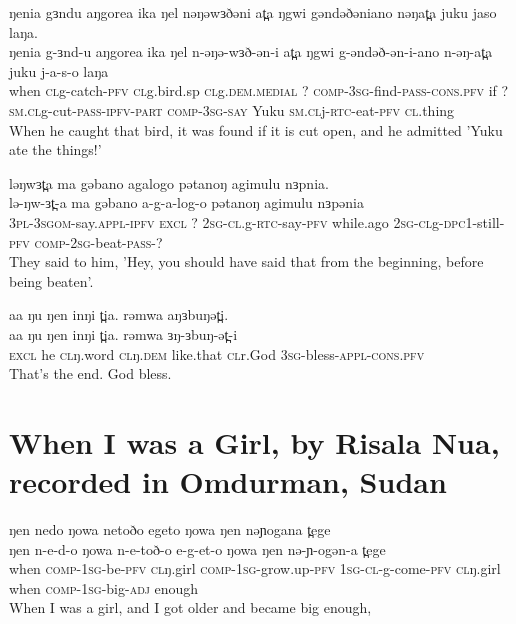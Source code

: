 \ex ŋenia gɜndu aŋgorea ika ŋel nəŋəwɜðəni at̪a ŋgwi gəndəðəniano nəŋat̪a juku jaso laŋa. 	  \\ 
	\gll  ŋenia g-ɜnd-u aŋgorea ika ŋel n-əŋə-wɜð-ən-i at̪a ŋgwi g-əndəð-ən-i-ano n-əŋ-at̪a juku j-a-s-o laŋa\\	
		  when \textsc{cl}g-catch-\textsc{pfv} \textsc{cl}g.bird.sp \textsc{cl}g.\textsc{dem.medial} ? \textsc{comp-3sg}-find-\textsc{pass-cons.pfv} if ? \textsc{sm.cl}g-cut-\textsc{pass-ipfv-part} \textsc{comp-3sg-say} Yuku \textsc{sm.cl}j-\textsc{rtc}-eat-\textsc{pfv} \textsc{cl}.thing  \\
		 \glt When he caught that bird, it was found if it is cut open, and he admitted 'Yuku ate the things!' 
		 	  	  
\ex  ləŋwɜt̪a ma gəbano agalogo pətanoŋ agimulu nɜpnia. 	  \\ 
	\gll  lə-ŋw-ɜt̪-a ma gəbano a-g-a-log-o pətanoŋ agimulu nɜpənia\\	
		  \textsc{3pl-3sgom}-say.\textsc{appl-ipfv} \textsc{excl} ? \textsc{2sg-cl}.g-\textsc{rtc}-say-\textsc{pfv} while.ago \textsc{2sg-cl}g-\textsc{dpc1}-still-\textsc{pfv} \textsc{comp-2sg}-beat-\textsc{pass-?} \\
		 \glt They said to him, 'Hey, you should have said that from the beginning, before being beaten'.  
		 	  	  
\ex  aa ŋu ŋen inŋi t̪ia. rəmwa aŋɜbuŋət̪i. \\ 
	\gll  aa ŋu ŋen inŋi t̪ia. rəmwa ɜŋ-ɜbuŋ-ət̪-i\\	
		  \textsc{excl} he \textsc{cl}ŋ.word \textsc{cl}ŋ.\textsc{dem} like.that \textsc{cl}r.God \textsc{3sg}-bless-\textsc{appl-cons.pfv}  \\
		 \glt That's the end. God bless.\z  


\section{When I was a Girl, by Risala Nua, recorded in Omdurman, Sudan}

\ea  	ŋen nedo ŋowa netoðo egeto ŋowa ŋen nəɲogana t̪ege \\ 
		\gll  ŋen n-e-d-o ŋowa n-e-toð-o e-g-et-o ŋowa ŋen nə-ɲ-ogən-a t̪ege \\	
		  when \textsc{comp-1sg}-be-\textsc{pfv} \textsc{cl}ŋ.girl \textsc{comp-1sg}-grow.up-\textsc{pfv} \textsc{1sg-cl}-g-come-\textsc{pfv} \textsc{cl}ŋ.girl when \textsc{comp-1sg}-big-\textsc{adj} enough \\
		 \glt When I was a girl, and I got older and became big enough,
		 		 	  	  
